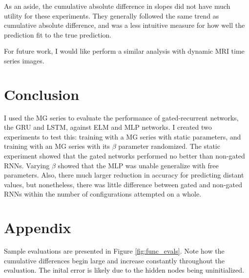 \documentclass[11pt]{article}
\begin{document}
As an aside, the cumulative absolute difference in slopes did not have
much utility for these experiments. They generally followed the same
trend as cumulative absolute difference, and was a less
intuitive measure for how well the prediction fit to the true prediction. %

For future work, I would like perform a similar analysis with dynamic
MRI time series images.

 \section{Conclusion}
I used the MG series to evaluate the performance of gated-recurrent
networks, the GRU and LSTM, against ELM and MLP networks. I created
two  experiments to test this: training with a MG series with
static parameters, and training with an MG series with its $\beta$
parameter randomized. The static experiment showed that the gated
networks performed no better than non-gated RNNs. Varying $\beta$  showed that the MLP was unable generalize with free
parameters. Also, there much larger reduction in accuracy for
predicting distant values, but nonetheless, there was little
difference between gated and non-gated RNNs within the number
of configurations attempted on a whole.
\clearpage



\clearpage
\section*{Appendix}
 Sample evaluations are presented
  in Figure \ref{fig:func_evals}.  Note how the cumulative
   differences begin large and increase constantly throughout the
   evaluation. The inital error is likely due to the hidden nodes being uninitialized.
\end{document}
